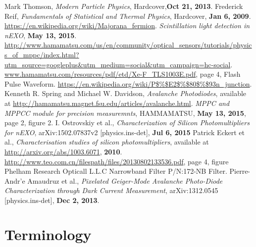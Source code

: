 \documentclass[a4paper, 11pt]{report}%
\newcommand{\xfl}{Xenon flash lamp }
\begin{document}
  
\begin{thebibliography}{999}
   Mark Thomson, \textit{Modern Particle Physics}, Hardcover,\textbf{Oct 21, 2013}.
   Frederick Reif, \textit{Fundamentals of Statistical and Thermal Physics}, 
  Hardcover, \textbf{Jan 6, 2009}.
   \url{https://en.wikipedia.org/wiki/Majorana_fermion}.
   \textit{Scintillation light detection in nEXO}, \textbf{May 13, 2015}.
   \url{http://www.hamamatsu.com/us/en/community/optical_sensors/tutorials/physics_of_mppc/index.html?utm_source=googleplus&utm_medium=social&utm_campaign=hc-social}.
  \bibitem{ref:\xfl} \url{www.hamamatsu.com/resources/pdf/etd/Xe-F_TLS1003E.pdf}, page 4, Flash Pulse Waveform.
   \url{https://en.wikipedia.org/wiki/P$\%$E2$\%$80$\%$93n_junction}.
   Kenneth R. Spring and Michael W. Davidson, \textit{Avalanche Photodiodes}, available at \url{http://hamamatsu.magnet.fsu.edu/articles/avalanche.html}.
   \textit{MPPC and MPPCC module for precision measuremnts}, HAMMAMATSU, \textbf{May 13, 2015}, page 2, figure 2.
   I. Ostrovskiy et al., \textit{Characterization of Silicon Photomultipliers for nEXO}, arXiv:1502.07837v2 [physics.ins-det], \textbf{Jul 6, 2015}
   Patrick Eckert et al., \textit{Characterisation studies of silicon photomultipliers}, available at \url{http://arxiv.org/abs/1003.6071}, \textbf{2010}.
   \url{http://www.teo.com.cn/filespath/files/20130802133536.pdf}, page 4, figure Phelham Research Opticall L.L.C Narrowband Filter P/N:172-NB Filter.
   Pierre-Andr'e Amaudruz et al., \textit{Pixelated Geiger-Mode Avalanche Photo-Diode Characterization through Dark Current Measurement}, arXiv:1312.0545 [physics.ins-det], \textbf{Dec 2, 2013}.
\end{thebibliography}


\appendix

\chapter{Terminology}\label{anx:terminology}
  
\end{document}
